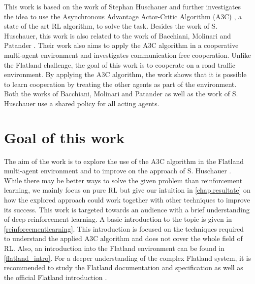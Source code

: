 This work is based on the work of Stephan Huschauer \cite{flatlandstephan} and further investigates the idea to use the Asynchronous Advantage Actor-Critic Algorithm (A3C) \cite{a3c}, a state of the art RL algorithm, to solve the task.
Besides the work of S. Huschauer, this work is also related to the work of Bacchiani, Molinari and Patander \cite{marltraffica3c}. Their work also aims to apply the A3C algorithm in a cooperative multi-agent environment and investigates communication free cooperation.
Unlike the Flatland challenge, the goal of this work is to cooperate on a road traffic environment. By applying the A3C algorithm, the work shows that it is possible to learn cooperation by treating the other agents as part of the environment. Both the works of Bacchiani, Molinari and Patander as well as the work of S. Huschauer use a shared policy for all acting agents.

\section{Goal of this work}\label{zielsetzung}
The aim of the work is to explore the use of the A3C algorithm in the Flatland multi-agent environment and to improve on the approach of S. Huschauer \cite{flatlandstephan}.\\
While there may be better ways to solve the given problem than reinforcement learning, we mainly focus on pure RL but give our intuition in \autoref{chap.resultate} on how the explored approach could work together with other techniques to improve its success.
This work is targeted towards an audience with a brief understanding of deep reinforcement learning. A basic introduction to the topic is given in \autoref{reinforcementlearning}. This introduction is focused on the techniques required to understand the applied A3C algorithm and does not cover the whole field of RL.
Also, an introduction into the Flatland environment can be found in \autoref{flatland_intro}. For a deeper understanding of the complex Flatland system, it is recommended to study the Flatland documentation and specification \cite{flatland_docu} as well as the official Flatland introduction \cite{aicrowd}.

